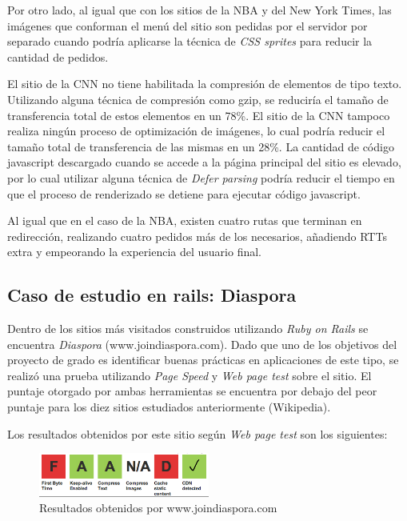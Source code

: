 Por otro lado, al igual que con los sitios de la NBA y del New York Times, las imágenes que conforman el menú del sitio son pedidas por el servidor por separado cuando podría
aplicarse la técnica de \emph{CSS sprites} para reducir la cantidad de pedidos.

El sitio de la CNN no tiene habilitada la compresión de elementos de tipo texto. Utilizando alguna técnica de compresión como gzip, se reduciría el tamaño de transferencia
total de estos elementos en un 78\%. El sitio de la CNN tampoco realiza ningún proceso de optimización de imágenes, lo cual podría reducir el tamaño total de transferencia de las
mismas en un 28\%. La cantidad de código javascript descargado cuando se accede a la página principal del sitio es elevado, por lo cual utilizar alguna técnica de \emph{Defer
parsing} podría reducir el tiempo en que el proceso de renderizado se detiene para ejecutar código javascript.

Al igual que en el caso de la NBA, existen cuatro rutas que terminan en redirección, realizando cuatro pedidos más de los necesarios, añadiendo RTTs extra y empeorando la
experiencia del usuario final.

\subsection{Caso de estudio en rails: Diaspora}

Dentro de los sitios más visitados construidos utilizando \emph{Ruby on Rails} se encuentra \emph{Diaspora} (www.joindiaspora.com). Dado que uno de los objetivos del proyecto de grado es identificar buenas
prácticas en aplicaciones de este tipo, se realizó una prueba utilizando \emph{Page Speed} y \emph{Web page test} sobre el sitio. El puntaje otorgado por ambas herramientas se encuentra por debajo del peor puntaje para los diez sitios estudiados anteriormente (Wikipedia).

Los resultados obtenidos por este sitio según \emph{Web page test} son los siguientes:

\begin{figure}[h]
\centering
\includegraphics[width=0.5\textwidth]{figuras/lado_cliente/diaspora/page_results.png}
  \caption{Resultados obtenidos por www.joindiaspora.com}
    \label{fig.diaspora_page_results}
\end{figure}

